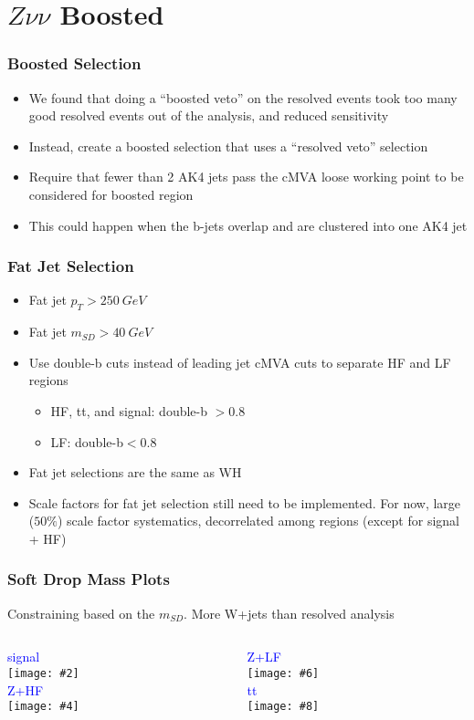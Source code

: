 \documentclass{beamer}
\newcommand{\fourfigs}[8]{
  \begin{columns}
    \begin{column}{0.3\linewidth}
      \centering
      \textcolor{blue}{#1} \\
      \texttt{[image: \#2]} \\
      \textcolor{blue}{#3} \\
      \texttt{[image: \#4]}
    \end{column}
    \begin{column}{0.3\linewidth}
      \centering
      \textcolor{blue}{#5} \\
      \texttt{[image: \#6]} \\
      \textcolor{blue}{#7} \\
      \texttt{[image: \#8]}
    \end{column}
  \end{columns}
}
\begin{document}
\section{$Z\nu\nu$ Boosted}

\begin{frame}
  \frametitle{Boosted Selection}
  \begin{itemize}
  \item We found that doing a ``boosted veto'' on the resolved events took too many
    good resolved events out of the analysis, and reduced sensitivity
  \item Instead, create a boosted selection that uses a ``resolved veto'' selection
  \item Require that fewer than 2 AK4 jets pass the cMVA loose working point to be considered
    for boosted region
  \item This could happen when the b-jets overlap and are clustered into one AK4 jet
  \end{itemize}
\end{frame}

\begin{frame}
  \frametitle{Fat Jet Selection}
  \begin{itemize}
  \item Fat jet $p_T > \SI{250}{GeV}$
  \item Fat jet $m_{SD} > \SI{40}{GeV}$
  \item Use double-b cuts instead of leading jet cMVA cuts to separate HF and LF regions
    \begin{itemize}
    \item HF, tt, and signal: double-b $> 0.8$
    \item LF: double-b$< 0.8$
    \end{itemize}
  \item Fat jet selections are the same as WH
  \item Scale factors for fat jet selection still need to be implemented.
    For now, large ($50\%$) scale factor systematics,
    decorrelated among regions (except for signal + HF)
  \end{itemize}
\end{frame}

\begin{frame}
  \frametitle{Soft Drop Mass Plots}
  Constraining based on the $m_{SD}$. More W+jets than resolved analysis

  \fourfigs{signal}
           {180328_v3/boosted_signal_fatjet1_mSD_corr}
           {Z+HF}
           {180328_v1/boosted_heavyz_fatjet1_mSD_corr}
           {Z+LF}
           {180327_v4/boosted_lightz_fatjet1_mSD_corr}
           {tt}
           {180327_v4/boosted_tt_fatjet1_mSD_corr}
\end{frame}
\end{document}
